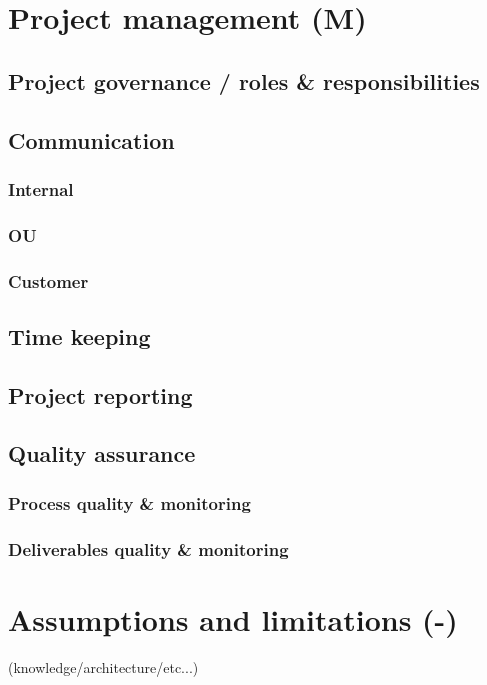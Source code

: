 \documentclass[a4paper,12pt,abstracton,titlepage]{scrartcl}
\begin{document}
\section{Project management (M)}
\label{sec:project-management}
\subsection{Project governance / roles \& responsibilities}
\lipsum[1]
\subsection{Communication}
\lipsum[1]
\subsubsection{Internal}
\lipsum[1]
\subsubsection{OU}
\lipsum[1]
\subsubsection{Customer}
\lipsum[1]
\subsection{Time keeping}
\lipsum[1]
\subsection{Project reporting}
\lipsum[1]
\subsection{Quality assurance}
\lipsum[1]
\subsubsection{Process quality \& monitoring}
\lipsum[1]
\subsubsection{Deliverables quality \& monitoring}
\lipsum[1]

\section{Assumptions and limitations (-)}
\label{sec:assumptions-limitations}
(knowledge/architecture/etc...)
\end{document}
